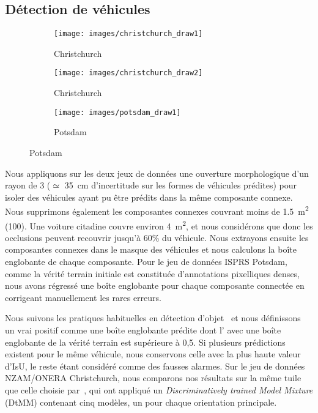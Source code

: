 \subsection{Détection de véhicules}
\begin{figure}[t]
\centering
	\begin{subfigure}{0.3\textwidth}
    	\texttt{[image: images/christchurch\_draw1]}
    	\caption*{Christchurch}
    \end{subfigure}
    \begin{subfigure}{0.3\textwidth}
    	\texttt{[image: images/christchurch\_draw2]}
    	\caption*{Christchurch}
    \end{subfigure}\begin{subfigure}{0.3\textwidth}
    	\texttt{[image: images/potsdam\_draw1]}
    	\caption*{Potsdam}
    \end{subfigure}\vspace{-12pt}
    \label{fig:detection_samples}
\end{figure}

Nous appliquons sur les deux jeux de données une ouverture morphologique d'un rayon de \SI{3}{\px} ($\simeq$ \SI{35}{\centi\meter} d'incertitude sur les formes de véhicules prédites) pour isoler des véhicules ayant pu être prédits dans la même composante connexe. Nous supprimons également les composantes connexes couvrant moins de \SI{1,5}{\meter\squared} (\SI{100}{\px}). Une voiture citadine couvre environ \SI{4}{\meter\squared}, et nous considérons que donc les occlusions peuvent recouvrir jusqu'à 60\% du véhicule. Nous extrayons ensuite les composantes connexes dans le masque des véhicules et nous calculons la boîte englobante de chaque composante. Pour le jeu de données \gls{ISPRS} Potsdam, comme la vérité terrain initiale est constituée d'annotations pixelliques denses, nous avons régressé une boîte englobante pour chaque composante connectée en corrigeant manuellement les rares erreurs.

Nous suivons les pratiques habituelles en détection d'objet~\cite{everingham_pascal_2014} et nous définissons un vrai positif comme une boîte englobante prédite dont l' avec une boîte englobante de la vérité terrain est supérieure à 0,5. Si plusieurs prédictions existent pour le même véhicule, nous conservons celle avec la plus haute valeur d'\gls{IsU}, le reste étant considéré comme des fausses alarmes. Sur le jeu de données NZAM/ONERA Christchurch, nous comparons nos résultats sur la même tuile que celle choisie par~\citet{randrianarivo_contextual_2016}, qui ont appliqué un \emph{Discriminatively trained Model Mixture} (DtMM) contenant cinq modèles, un pour chaque orientation principale.

